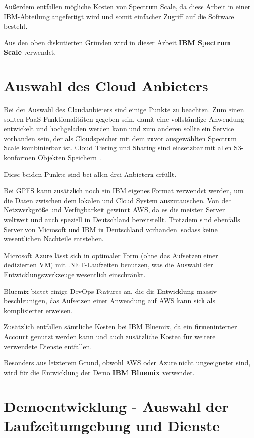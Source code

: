 Außerdem entfallen mögliche Kosten von Spectrum Scale, da diese Arbeit in einer IBM-Abteilung angefertigt wird und somit einfacher Zugriff auf die Software besteht.

Aus den oben diskutierten Gründen wird in dieser Arbeit \textbf{IBM Spectrum Scale} verwendet.

\section{Auswahl des Cloud Anbieters}

Bei der Auswahl des Cloudanbieters sind einige Punkte zu beachten. Zum einen sollten \acs{PaaS} Funktionalitäten gegeben sein, damit eine vollständige Anwendung entwickelt und hochgeladen werden kann und zum anderen sollte ein Service vorhanden sein, der als Cloudspeicher mit dem zuvor ausgewählten Spectrum Scale kombinierbar ist.
Cloud Tiering und Sharing sind einsetzbar mit allen S3-konformen Objekten Speichern \parencite[S. 110]{ibm.2017}. 

Diese beiden Punkte sind bei allen drei Anbietern erfüllt.

Bei \acs{GPFS} kann zusätzlich noch ein IBM eigenes Format verwendet werden, um die Daten zwischen dem lokalen und Cloud System auszutauschen.
Von der Netzwerkgröße und Verfügbarkeit gewinnt \acs{AWS}, da es die meisten Server weltweit und auch speziell in Deutschland bereitstellt. Trotzdem sind ebenfalls Server von Microsoft und IBM in Deutschland vorhanden, sodass keine wesentlichen Nachteile entstehen.

Microsoft Azure lässt sich in optimaler Form (ohne das Aufsetzen einer dedizierten \acs{VM}) mit .NET-Laufzeiten benutzen, was die Auswahl der Entwicklungswerkzeuge wesentlich einschränkt.

Bluemix bietet einige DevOps-Features an, die die Entwicklung massiv beschleunigen, das Aufsetzen einer Anwendung auf \acs{AWS} kann sich als komplizierter erweisen.

Zusätzlich entfallen sämtliche Kosten bei IBM Bluemix, da ein firmeninterner Account genutzt werden kann und auch zusätzliche Kosten für weitere verwendete Dienste entfallen.

Besonders aus letzterem Grund, obwohl AWS oder Azure nicht ungeeigneter sind, wird für die Entwicklung der Demo \textbf{IBM Bluemix} verwendet.

\section{Demoentwicklung - Auswahl der Laufzeitumgebung und Dienste}

